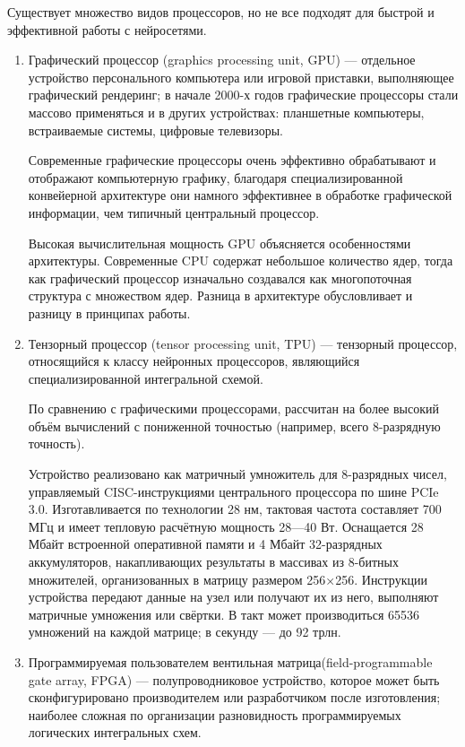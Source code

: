 \documentclass{article}
\begin{document}
    Существует множество видов процессоров, но не все подходят для быстрой и эффективной работы с нейросетями.\\
    \begin{enumerate} 
    \item 
    Графический процессор (graphics processing unit, GPU) — отдельное устройство персонального компьютера или игровой приставки, выполняющее графический рендеринг; в начале 2000-х годов графические процессоры стали массово применяться и в других устройствах: планшетные компьютеры, встраиваемые системы, цифровые телевизоры.
    
    Современные графические процессоры очень эффективно обрабатывают и отображают компьютерную графику, благодаря специализированной конвейерной архитектуре они намного эффективнее в обработке графической информации, чем типичный центральный процессор.
    
    Высокая вычислительная мощность GPU объясняется особенностями архитектуры. Современные CPU содержат небольшое количество ядер, тогда как графический процессор изначально создавался как многопоточная структура с множеством ядер. Разница в архитектуре обусловливает и разницу в принципах работы. 
    \item 
    Тензорный процессор (tensor processing unit, TPU) — тензорный процессор, относящийся к классу нейронных процессоров, являющийся специализированной интегральной схемой.
    
    По сравнению с графическими процессорами, рассчитан на более высокий объём вычислений с пониженной точностью (например, всего 8-разрядную точность).
    
    Устройство реализовано как матричный умножитель для 8-разрядных чисел, управляемый CISC-инструкциями центрального процессора по шине PCIe 3.0. Изготавливается по технологии 28 нм, тактовая частота составляет 700 МГц и имеет тепловую расчётную мощность 28—40 Вт. Оснащается 28 Мбайт встроенной оперативной памяти и 4 Мбайт 32-разрядных аккумуляторов, накапливающих результаты в массивах из 8-битных множителей, организованных в матрицу размером 256×256. Инструкции устройства передают данные на узел или получают их из него, выполняют матричные умножения или свёртки. В такт может производиться 65536 умножений на каждой матрице; в секунду — до 92 трлн.
    \item
    Программируемая пользователем вентильная матрица(field-programmable gate array, FPGA) — полупроводниковое устройство, которое может быть сконфигурировано производителем или разработчиком после изготовления; наиболее сложная по организации разновидность программируемых логических интегральных схем.
    

\end{enumerate}
\end{document}
